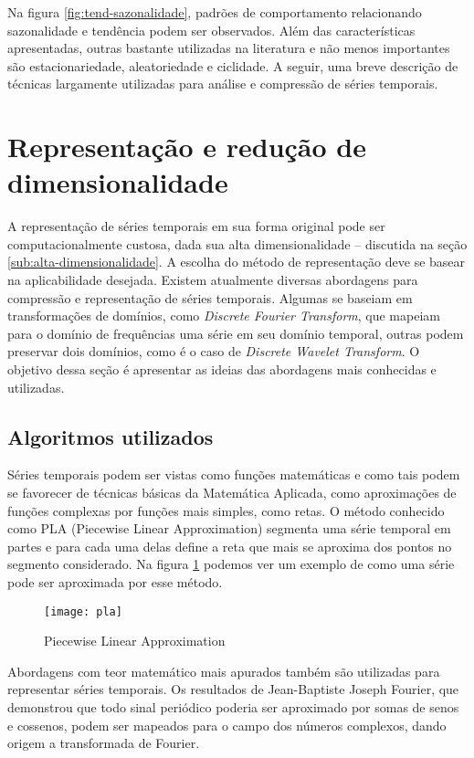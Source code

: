 Na figura \ref{fig:tend-sazonalidade}, padrões de comportamento relacionando sazonalidade e tendência podem ser observados. Além das características apresentadas, outras bastante utilizadas na literatura e não menos importantes são  estacionariedade, aleatoriedade e ciclidade. A seguir, uma breve descrição de técnicas largamente utilizadas para análise e compressão de séries temporais.

\section{Representação e redução de dimensionalidade}
A representação de séries temporais em sua forma original pode ser computacionalmente custosa, dada sua alta dimensionalidade -- discutida na seção \ref{sub:alta-dimensionalidade}. A escolha do método de representação deve se basear na aplicabilidade desejada. Existem atualmente diversas abordagens para compressão e representação de séries temporais. Algumas se baseiam em transformações de domínios, como \textit{Discrete Fourier Transform}, que mapeiam para o domínio de frequências uma série em seu domínio temporal, outras podem preservar dois domínios, como é o caso de \textit{Discrete Wavelet Transform}. O objetivo dessa seção é apresentar as ideias das abordagens mais conhecidas e utilizadas.

\subsection{Algoritmos utilizados}
Séries temporais podem ser vistas como funções matemáticas e como tais podem se favorecer de técnicas básicas da Matemática Aplicada, como aproximações de funções complexas por funções mais simples, como retas. O método conhecido como PLA (Piecewise Linear Approximation) segmenta uma série temporal em partes e para cada uma delas define a reta que mais se aproxima dos pontos no segmento considerado. Na figura \ref{fig:pla} podemos ver um exemplo de como uma série pode ser aproximada por esse método.

  \begin{figure}[htb!]
    \begin{center}
      \texttt{[image: pla]}
      \centering
      \caption{Piecewise Linear Approximation}
    \label{fig:pla}
    \end{center}
  \end{figure}

Abordagens com teor matemático mais apurados também são utilizadas para representar séries temporais. Os resultados de Jean-Baptiste Joseph Fourier, que demonstrou que todo sinal periódico poderia ser aproximado por somas de senos e cossenos, podem ser mapeados para o campo dos números complexos, dando origem a transformada de Fourier.

